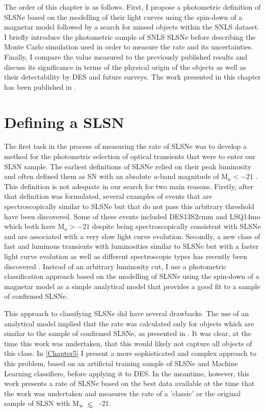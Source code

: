 The order of this chapter is as follows. First, I propose a photometric definition of SLSNe based on the modelling of their light curves using the spin-down of a magnetar model followed by a search for missed objects within the SNLS dataset. I briefly introduce the photometric sample of SNLS SLSNe before describing the Monte Carlo simulation used in order to measure the rate and its uncertainties. Finally, I compare the value measured to the previously published results and discuss its significance in terms of the physical origin of the objects as well as their detectability by DES and future surveys. The work presented in this chapter has been published in \citet{Prajs2016}.

\section{Defining a SLSN}
\label{sec:SLSNDefinition}
The first task in the process of measuring the rate of SLSNe was to develop a method for the photometric selection of optical transients that were to enter our SLSN sample. The earliest definitions of SLSNe relied on their peak luminosity and often defined them as SN with an absolute $u$-band magnitude of $\mathrm{M}_{u}<-21$ \citep{Gal-Yam2012}. This definition is not adequate in our search for two main reasons. Firstly, after that definition was formulated, several examples of events that are spectroscopically similar to SLSNe but that do not pass this arbitrary threshold have been discovered. Some of these events included DES13S2cmm \citep{Papadopoulos2015} and LSQ14mo \citep{Leloudas2015a} which both have $\mathrm{M}_u > -21$ despite being spectroscopically consistent with SLSNe and are associated with a very slow light curve evolution. Secondly, a new class of fast and luminous transients with luminosities similar to SLSNe but with a faster light curve evolution as well as different spectroscopic types has recently been discovered \citep{Drout2014,Arcavi2016,Pursiainen2018}. Instead of an arbitrary luminosity cut, I use a photometric classification approach based on the modelling of SLSNe using the spin-down of a magnetar model as a simple analytical model that provides a good fit to a sample of confirmed SLSNe.

This approach to classifying SLSNe did have several drawbacks. The use of an analytical model implied that the rate was calculated only for objects which are similar to the sample of confirmed SLSNe, as presented in . It was clear, at the time this work was undertaken, that this would likely not capture all objects of this class. In \cref{Chapter5} I present a more sophisticated and complex approach to this problem, based on an artificial training sample of SLSNe and Machine Learning classifiers, before applying it to DES. In the meantime, however, this work presents a rate of SLSNe based on the best data available at the time that the work was undertaken and measures the rate of a 'classic' or the original sample of SLSN with M$_u~\ltsim $~-21.

